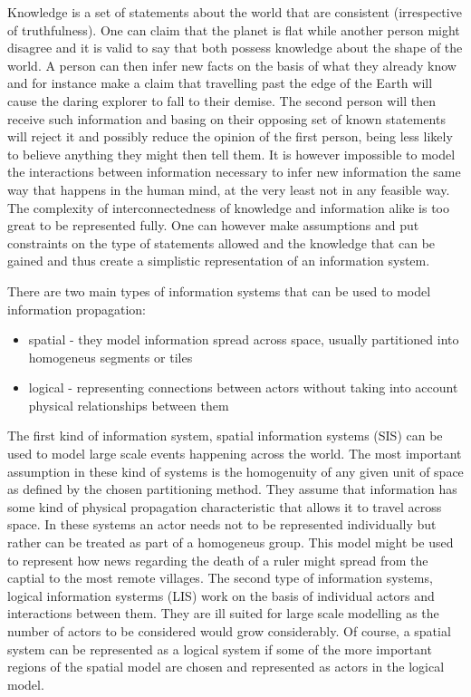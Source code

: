 Knowledge is a set of statements about the world that are consistent (irrespective of truthfulness).
One can claim that the planet is flat while another person might disagree and it is valid to say that both possess knowledge about the shape of the world.
A person can then infer new facts on the basis of what they already know and for instance make a claim that travelling past the edge of the Earth will cause the daring explorer to fall to their demise.
The second person will then receive such information and basing on their opposing set of known statements will reject it and possibly reduce the opinion of the first person, being less likely to believe anything they might then tell them.
It is however impossible to model the interactions between information necessary to infer new information the same way that happens in the human mind, at the very least not in any feasible way.
The complexity of interconnectedness of knowledge and information alike is too great to be represented fully.
One can however make assumptions and put constraints on the type of statements allowed and the knowledge that can be gained and thus create a simplistic representation of an information system.

There are two main types of information systems that can be used to model information propagation:
\begin{itemize}
    \item spatial - they model information spread across space, usually partitioned into homogeneus segments or tiles
    \item logical - representing connections between actors without taking into account physical relationships between them
\end{itemize}
The first kind of information system, spatial information systems (SIS) can be used to model large scale events happening across the world.
The most important assumption in these kind of systems is the homogenuity of any given unit of space as defined by the chosen partitioning method.
They assume that information has some kind of physical propagation characteristic that allows it to travel across space.
In these systems an actor needs not to be represented individually but rather can be treated as part of a homogeneus group.
This model might be used to represent how news regarding the death of a ruler might spread from the captial to the most remote villages.
The second type of information systems, logical information systerms (LIS) work on the basis of individual actors and interactions between them.
They are ill suited for large scale modelling as the number of actors to be considered would grow considerably.
Of course, a spatial system can be represented as a logical system if some of the more important regions of the spatial model are chosen and represented as actors in the logical model.

